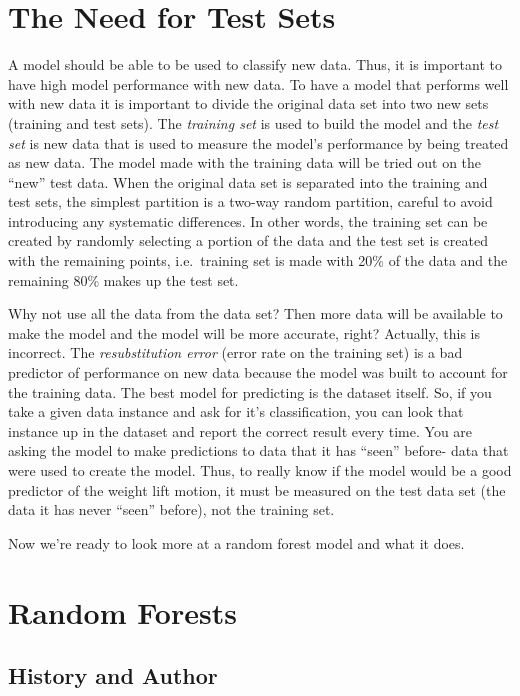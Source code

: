 \documentclass[12pt,twoside]{reedthesis}
\begin{document}
  \section{The Need for Test Sets}\label{the-need-for-test-sets}
  
  A model should be able to be used to classify new data. Thus, it is
  important to have high model performance with new data. To have a model
  that performs well with new data it is important to divide the original
  data set into two new sets (training and test sets). The \emph{training
  set} is used to build the model and the \emph{test set} is new data that
  is used to measure the model's performance by being treated as new data.
  The model made with the training data will be tried out on the ``new''
  test data. When the original data set is separated into the training and
  test sets, the simplest partition is a two-way random partition, careful
  to avoid introducing any systematic differences. In other words, the
  training set can be created by randomly selecting a portion of the data
  and the test set is created with the remaining points, i.e.~training set
  is made with 20\% of the data and the remaining 80\% makes up the test
  set.
  
  Why not use all the data from the data set? Then more data will be
  available to make the model and the model will be more accurate, right?
  Actually, this is incorrect. The \emph{resubstitution error} (error rate
  on the training set) is a bad predictor of performance on new data
  because the model was built to account for the training data. The best
  model for predicting is the dataset itself. So, if you take a given data
  instance and ask for it's classification, you can look that instance up
  in the dataset and report the correct result every time. You are asking
  the model to make predictions to data that it has ``seen'' before- data
  that were used to create the model. Thus, to really know if the model
  would be a good predictor of the weight lift motion, it must be measured
  on the test data set (the data it has never ``seen'' before), not the
  training set.
  
  Now we're ready to look more at a random forest model and what it does.
  
  \section{Random Forests}\label{random-forests}
  
  \subsection{History and Author}\label{history-and-author}
  
\end{document}
